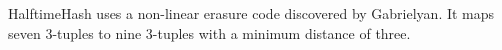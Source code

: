 \documentclass[runningheads]{llncs}
\newcommand{\ints}{\mathbb{Z}}
\begin{document}




HalftimeHash uses a non-linear erasure code discovered by Gab\-ri\-el\-yan. \cite{9-7-erasure-code}
It maps seven 3-tuples to nine 3-tuples with a minimum distance of three.


\end{document}
